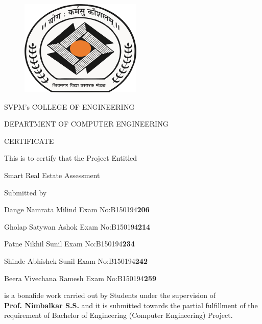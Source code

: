 \documentclass[11pt,fleqn]{book} %
\begin{document}
\newpage


\begin{figure}[ht]
\centering
\includegraphics[scale=0.4]{Pictures/coem.png}
\end{figure}


{\bfseries \fontsize{14}{12} \selectfont \centerline{SVPM's COLLEGE OF ENGINEERING}
\centerline{DEPARTMENT OF COMPUTER ENGINEERING}
\vspace*{1.2\baselineskip}} 


{\bfseries \fontsize{20}{20} \selectfont \centerline{\color{ocre} CERTIFICATE} 
\vspace*{1.4\baselineskip}} 

\centerline{This is to certify that the Project Entitled}
\vspace*{1\baselineskip} 


{\bfseries \fontsize{20}{12} \selectfont \centerline{\color{ocre}\LARGE Smart Real Estate Assessment}
\vspace*{1\baselineskip}}

\centerline{Submitted by}
\vspace*{0.72\baselineskip} 
\centerline{\LARGE Dange Namrata Milind \hspace{25 mm} Exam No:B150194\textbf{\color{ocre}206}}
\vspace{2mm}
\centerline{\LARGE Gholap Satywan Ashok \hspace{24 mm} Exam No:B150194\textbf{\color{ocre}214}}
\vspace{2mm}
\centerline{\LARGE Patne Nikhil Sunil \hspace{37 mm} Exam No:B150194\textbf{\color{ocre}234}}
\vspace{2mm}
\centerline{\LARGE Shinde Abhishek Sunil \hspace{26 mm} Exam No:B150194\textbf{\color{ocre}242}}
\vspace{2mm}
\centerline{\LARGE Beera Vivechana Ramesh \hspace{20 mm} Exam No:B150194\textbf{\color{ocre}259}}
\vspace*{1\baselineskip} 
is a bonafide work carried out by Students under the supervision of\\ \textbf{\LARGE\color{ocre} Prof. Nimbalkar S.S.} and it
is submitted towards the partial fulfillment of the requirement of Bachelor of Engineering (Computer Engineering) Project.\\[1cm]
\end{document}
